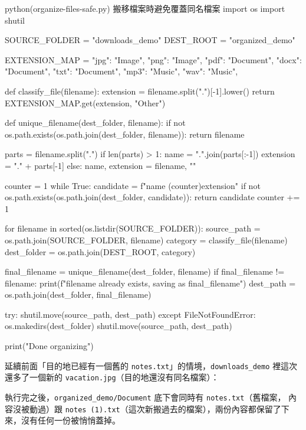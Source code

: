 \begin{example}{python}{(organize-files-safe.py) 搬移檔案時避免覆蓋同名檔案}
import os
import shutil

SOURCE_FOLDER = "downloads_demo"
DEST_ROOT = "organized_demo"

EXTENSION_MAP = {
    "jpg": "Image", "png": "Image",
    "pdf": "Document", "docx": "Document", "txt": "Document",
    "mp3": "Music", "wav": "Music",
}


def classify_file(filename):
    extension = filename.split(".")[-1].lower()
    return EXTENSION_MAP.get(extension, "Other")


def unique_filename(dest_folder, filename):
    if not os.path.exists(os.path.join(dest_folder, filename)):
        return filename

    parts = filename.split(".")
    if len(parts) > 1:
        name = ".".join(parts[:-1])
        extension = "." + parts[-1]
    else:
        name, extension = filename, ""

    counter = 1
    while True:
        candidate = f"{name} ({counter}){extension}"
        if not os.path.exists(os.path.join(dest_folder, candidate)):
            return candidate
        counter += 1


for filename in sorted(os.listdir(SOURCE_FOLDER)):
    source_path = os.path.join(SOURCE_FOLDER, filename)
    category = classify_file(filename)
    dest_folder = os.path.join(DEST_ROOT, category)

    final_filename = unique_filename(dest_folder, filename)
    if final_filename != filename:
        print(f"{filename} already exists, saving as {final_filename}")
    dest_path = os.path.join(dest_folder, final_filename)

    try:
        shutil.move(source_path, dest_path)
    except FileNotFoundError:
        os.makedirs(dest_folder)
        shutil.move(source_path, dest_path)

print("Done organizing")
\end{example}

延續前面「目的地已經有一個舊的 \texttt{notes.txt}」的情境，\texttt{downloads\_demo}
裡這次還多了一個新的 \texttt{vacation.jpg}（目的地還沒有同名檔案）：


執行完之後，\texttt{organized\_demo/Document} 底下會同時有 \texttt{notes.txt}（舊檔案，
內容沒被動過）跟 \texttt{notes (1).txt}（這次新搬過去的檔案），兩份內容都保留了下
來，沒有任何一份被悄悄蓋掉。

